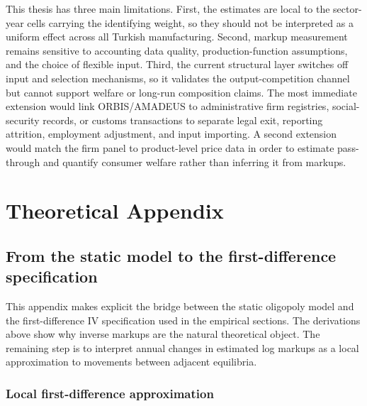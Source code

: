 ﻿\documentclass[12pt]{article}
\begin{document}
This thesis has three main limitations. First, the estimates are local to the sector-year cells carrying the identifying weight, so they should not be interpreted as a uniform effect across all Turkish manufacturing. Second, markup measurement remains sensitive to accounting data quality, production-function assumptions, and the choice of flexible input. Third, the current structural layer switches off input and selection mechanisms, so it validates the output-competition channel but cannot support welfare or long-run composition claims. The most immediate extension would link ORBIS/AMADEUS to administrative firm registries, social-security records, or customs transactions to separate legal exit, reporting attrition, employment adjustment, and input importing. A second extension would match the firm panel to product-level price data in order to estimate pass-through and quantify consumer welfare rather than inferring it from markups.
\pagebreak

\printbibliography

\pagebreak

\appendix

\small

\section{Theoretical Appendix}
\label{app:theory_appendix}



\subsection{From the static model to the first-difference specification}
\label{app:bridge}

This appendix makes explicit the bridge between the static oligopoly model and the first-difference IV specification used in the empirical sections. The derivations above show why inverse markups are the natural theoretical object. The remaining step is to interpret annual changes in estimated log markups as a local approximation to movements between adjacent equilibria.

\subsubsection*{Local first-difference approximation}
\end{document}
